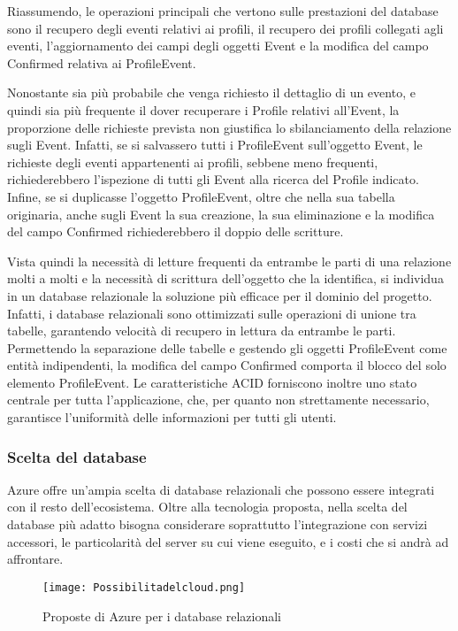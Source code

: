 Riassumendo, le operazioni principali che vertono sulle prestazioni del database sono il recupero degli eventi relativi ai profili, il recupero dei profili collegati agli eventi, l’aggiornamento dei campi degli oggetti Event e la modifica del campo Confirmed relativa ai ProfileEvent.

Nonostante sia più probabile che venga richiesto il dettaglio di un evento, e quindi sia più frequente il dover recuperare i Profile relativi all’Event, la proporzione delle richieste prevista non giustifica lo sbilanciamento della relazione sugli Event.
Infatti, se si salvassero tutti i ProfileEvent sull’oggetto Event, le richieste degli eventi appartenenti ai profili, sebbene meno frequenti, richiederebbero l’ispezione di tutti gli Event alla ricerca del Profile indicato. 
Infine, se si duplicasse l’oggetto ProfileEvent, oltre che nella sua tabella originaria, anche sugli Event la sua creazione, la sua eliminazione e la modifica del campo Confirmed richiederebbero il doppio delle scritture.

Vista quindi la necessità di letture frequenti da entrambe le parti di una relazione molti a molti e la necessità di scrittura dell’oggetto che la identifica, si individua in un database relazionale la soluzione più efficace per il dominio del progetto. Infatti, i database relazionali sono ottimizzati sulle operazioni di unione tra tabelle, garantendo velocità di recupero in lettura da entrambe le parti. Permettendo la separazione delle tabelle e gestendo gli oggetti ProfileEvent come entità indipendenti, la modifica del campo Confirmed comporta il blocco del solo elemento ProfileEvent. Le caratteristiche ACID forniscono inoltre uno stato centrale per tutta l’applicazione, che, per quanto non strettamente necessario, garantisce l’uniformità delle informazioni per tutti gli utenti.
\clearpage
\subsubsection{Scelta del database}

Azure offre un’ampia scelta di database relazionali che possono essere integrati con il resto dell’ecosistema. Oltre alla tecnologia proposta, nella scelta del database più adatto bisogna considerare soprattutto l’integrazione con servizi accessori, le particolarità del server su cui viene eseguito, e i costi che si andrà ad affrontare.

\begin{figure}[h!]
    \centering
    \texttt{[image: Possibilitadelcloud.png]}
    \caption{Proposte di Azure per i database relazionali}
\end{figure}	


